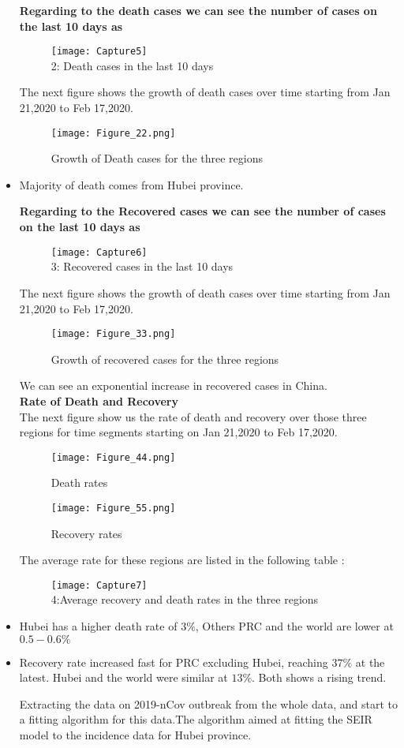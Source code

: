 \documentclass{exam}
\begin{document}
\begin{itemize}
 \textbf{Regarding to the death cases we can see the number of cases on the last 10 days as } 
\begin{figure}[H]
	\centering
	\texttt{[image: Capture5]}\\
	\tablename{2: Death cases in the last 10 days}
\end{figure}
The next figure shows the growth of death cases over time starting from Jan 21,2020 to Feb 17,2020.
  \begin{figure}[H]
  	\centering
  	\texttt{[image: Figure\_22.png]}\\
  	\caption{Growth of Death cases for the three regions}
  \end{figure}
\item Majority of death comes from Hubei province.

\textbf{Regarding to the Recovered cases we can see the number of cases on the last 10 days as } 
\begin{figure}[H]
	\centering
	\texttt{[image: Capture6]}\\
	\tablename{3: Recovered cases in the last 10 days}
\end{figure}
The next figure shows the growth of death cases over time starting from Jan 21,2020 to Feb 17,2020.
\begin{figure}[H]
	\centering
	\texttt{[image: Figure\_33.png]}\\
	\caption{Growth of recovered cases for the three regions}
\end{figure}
We can see an exponential increase in recovered cases in China.\\
\newpage
\textbf{Rate of Death and Recovery}\\
The next figure show us the rate of death and recovery over those three regions for time segments starting on Jan 21,2020 to Feb 17,2020.\\
\begin{figure}[H]
	\centering
	\texttt{[image: Figure\_44.png]}\\
	\caption{Death rates}
\end{figure}
\begin{figure}[H]
	\centering
	\texttt{[image: Figure\_55.png]}\\
	\caption{Recovery  rates}
\end{figure}
The average rate for these regions are listed in the following table :
\begin{figure}[H]
	\centering
	\texttt{[image: Capture7]}\\
	\tablename{ 4:Average recovery and death rates in the three regions}
\end{figure}
\item Hubei has a higher death rate of  $3 \% $, Others PRC and the world are lower at $0.5-0.6 \% $
\item Recovery rate increased fast for PRC excluding Hubei, reaching $37 \%$ at the latest. Hubei and the world were similar at $13 \% $. Both shows a rising trend. 
	

Extracting the data on 2019-nCov outbreak from the whole data, and start to a fitting algorithm for this data.The algorithm aimed at fitting the SEIR model to the incidence data for Hubei province. 
\end{itemize}
\end{document}
